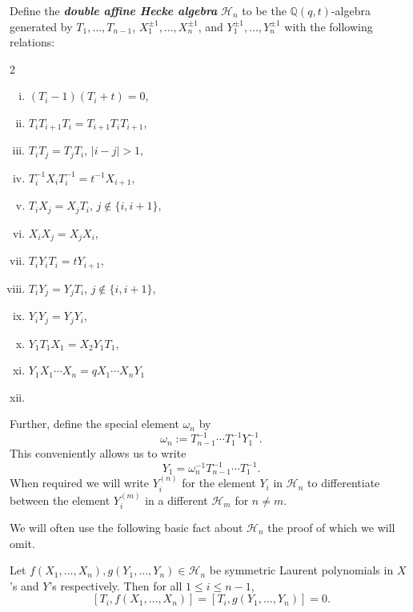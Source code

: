 \begin{defi} \label{defn1}
Define the \textbf{\textit{double affine Hecke algebra}} $\mathscr{H}_n$ to be the $\mathbb{Q}(q,t)$-algebra generated by $T_1,\ldots,T_{n-1}$, $X_1^{\pm 1},\ldots,X_{n}^{\pm 1}$, and $Y_1^{\pm 1},\ldots,Y_n^{\pm 1}$ with the following relations:



\begin{multicols}{2}
\begin{enumerate}[(i)]
    \item  
    \label{def-i} 
    $(T_i -1)(T_i +t) = 0$,
    \item [] $T_iT_{i+1}T_i = T_{i+1}T_iT_{i+1}$,
    \item [] $T_iT_j = T_jT_i$, $|i-j|>1$,
    \item 
    \label{def-ii} $T_i^{-1}X_iT_i^{-1} = t^{-1}X_{i+1}$,
    \item []$T_iX_j = X_jT_i$, $j \notin \{i,i+1\}$,
    \item []$X_iX_j = X_jX_i$,
    \item 
    \label{def-iii}$T_iY_iT_i = tY_{i+1}$,
    \item []$T_iY_j = Y_jT_i$, $j\notin \{i,i+1\}$,
    \item []$Y_iY_j = Y_jY_i$,
    \item 
    \label{def-iv}$Y_1T_1X_1 = X_2Y_1T_1$,
    \item 
    \label{def-v}$Y_1X_1\cdots X_n = qX_1\cdots X_nY_1$
    \item []
\end{enumerate}
\end{multicols}


Further, define the special element $\omega_n$ by $$\omega_n := T_{n-1}^{-1}\cdots T_1^{-1}Y_1^{-1}.$$ This conveniently allows us to write $$Y_1 = \omega_n^{-1}T_{n-1}^{-1}\cdots T_1^{-1}.$$ When required we will write $Y_i^{(n)}$ for the element $Y_i$ in $\mathscr{H}_n$ to differentiate between the element $Y_i^{(m)}$ in a different $\mathscr{H}_m$ for $n \neq m$.
\end{defi}

We will often use the following basic fact about $\mathscr{H}_n$ the proof of which we will omit. 

\begin{lemm} \label{sym x and y commute with T's}
    Let $f(X_1,\ldots,X_n), g(Y_1,\ldots, Y_n) \in \mathscr{H}_n$ be symmetric Laurent polynomials in $X$'s and $Y$'s respectively. Then for all $1 \leq i \leq n-1$, 
    $$[T_i,f(X_1,\ldots,X_n)] = [T_i,g(Y_1,\ldots, Y_n)] = 0.$$
\end{lemm}





